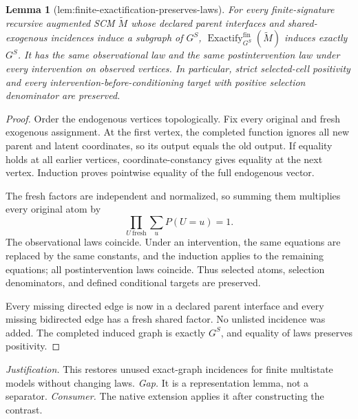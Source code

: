 \documentclass{article}
\newtheorem{lemma}{Lemma}
\begin{document}
\begin{lemma}[lem:finite-exactification-preserves-laws]\label{lem:finite-exactification-preserves-laws}
For every finite-signature recursive augmented SCM \(\widetilde M\) whose declared parent interfaces and shared-exogenous incidences induce a subgraph of \(G^S\), \(\operatorname{Exactify}^{\mathrm{fin}}_{G^S}(\widetilde M)\) induces exactly \(G^S\). It has the same observational law and the same postintervention law under every intervention on observed vertices. In particular, strict selected-cell positivity and every intervention-before-conditioning target with positive selection denominator are preserved.
\end{lemma}
\begin{proof}
Order the endogenous vertices topologically. Fix every original and fresh exogenous assignment. At the first vertex, the completed function ignores all new parent and latent coordinates, so its output equals the old output. If equality holds at all earlier vertices, coordinate-constancy gives equality at the next vertex. Induction proves pointwise equality of the full endogenous vector.

The fresh factors are independent and normalized, so summing them multiplies every original atom by
\[
 \prod_{U\ \mathrm{fresh}}\sum_uP(U=u)=1.
\]
The observational laws coincide. Under an intervention, the same equations are replaced by the same constants, and the induction applies to the remaining equations; all postintervention laws coincide. Thus selected atoms, selection denominators, and defined conditional targets are preserved.

Every missing directed edge is now in a declared parent interface and every missing bidirected edge has a fresh shared factor. No unlisted incidence was added. The completed induced graph is exactly \(G^S\), and equality of laws preserves positivity.
\end{proof}
\par\smallskip\noindent \textit{Justification.} This restores unused exact-graph incidences for finite multistate models without changing laws. \textit{Gap.} It is a representation lemma, not a separator. \textit{Consumer.} The native extension applies it after constructing the contrast.
\end{document}
